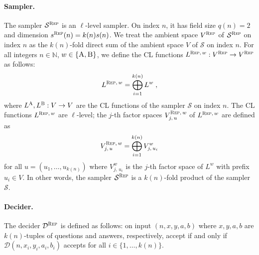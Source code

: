 \documentclass[11pt]{article}
\theoremstyle{definition}
\newcommand{\N}{\ensuremath{\mathbb{N}}}
\newcommand{\sampler}{\mathcal{S}}
\newcommand{\decider}{\mathcal{D}}
\newcommand{\gamestyle}[1]{\ensuremath{\textsc{#1}}\xspace}
\newcommand{\labelstyle}[1]{\ensuremath{\textsc{#1}}\xspace}
\newcommand{\alice}{\labelstyle{A}}
\newcommand{\bob}{\labelstyle{B}}
\newcommand{\AB}{\{\alice, \bob\}}
\newcommand{\rep}{\gamestyle{Rep}}
\begin{document}
\paragraph{Sampler.}
The sampler $\sampler^\rep$ is an $\ell$-level sampler.
On index $n$, it has field size $q(n) = 2$ and dimension $s^\rep(n) = k(n)
s(n)$.
We treat the ambient space $V^\rep$ of $\sampler^\rep$ on index $n$ as the
$k(n)$-fold direct sum of the ambient space $V$ of $\sampler$ on index $n$.
For all integers $n \in \N$, $w \in \AB$, we define the CL functions $L^{\rep,\,
  w}: V^\rep \to V^\rep$ as follows:
\[
	L^{\rep,\, w} = \bigoplus_{i = 1}^{k(n)} L^w\;,
\]
where $L^\alice,L^\bob:V \to V$ are the CL functions of the sampler $\sampler$
on index $n$. The CL functions $L^{\rep,\, w}$ are $\ell$-level; the $j$-th
factor spaces $V^{\rep,\, w}_{j,\, u}$ of $L^{\rep,\, w}$ are defined as
\[
	V^{\rep,\, w}_{j,\, u} = \bigoplus_{i = 1}^{k(n)} V^w_{j,\, u_i}
\]
for all $u = (u_1,\ldots,u_{k(n)})$ where $V^w_{j,\, u_i}$ is the $j$-th factor
space of $L^w$ with prefix $u_i \in V$.
In other words, the sampler $\sampler^\rep$ is a $k(n)$-fold product of the
sampler $\sampler$.%
\paragraph{Decider.}
The decider $\decider^\rep$ is defined as follows: on input
$(n,{x},{y},{a},{b})$ where ${x}, {y}, {a}, {b}$ are $k(n)$-tuples of questions
and answers, respectively, accept if and only if $\decider(n,x_i,y_i,a_i,b_i)$
accepts for all $i \in \{ 1,\ldots,k(n) \}$.
\end{document}
